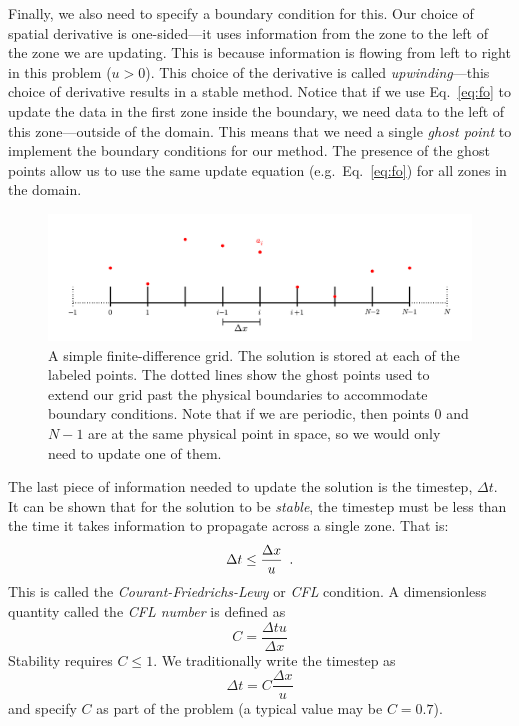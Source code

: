 Finally, we also need to specify a boundary condition for this.  Our
choice of spatial derivative is one-sided---it uses information from
the zone to the left of the zone we are updating.  This is because
information is flowing from left to right in this problem ($u > 0$).
This choice of the derivative is called {\em upwinding}---this choice
of derivative results in a stable method.
Notice that if we use Eq.~\ref{eq:fo} to update the data in the first
zone inside the boundary, we need data to the left of this
zone---outside of the domain.  This means that we need a single
{\em ghost point} to implement the boundary conditions for our method.  The
presence of the ghost points allow us to use the same update equation
(e.g.\ Eq.~\ref{eq:fo}) for all zones in the domain.


\begin{figure}[t]
\centering
\includegraphics[width=\linewidth]{fd_ghost}
\caption[A simple finite-difference grid]{\label{fig:fdgrid} A simple
  finite-difference grid.  The solution is stored at each of the
  labeled points.  The dotted lines show the ghost points used to
  extend our grid past the physical boundaries to accommodate boundary
  conditions.  Note that if we are periodic, then points $0$ and $N-1$
  are at the same physical point in space, so we would only need to
  update one of them.}
\end{figure}

The last piece of information needed to update the solution is the
timestep, $\Delta t$.  It can be shown that for the solution to be
{\em stable}, the timestep must be less than the time it takes information
to propagate across a single zone.  That is:
\begin{equation}
\Delta t \le \frac{\Delta x}{u} \enskip .
\end{equation}
This is called the {\em Courant-Friedrichs-Lewy} or {\em CFL}
condition.  A dimensionless quantity called the {\em CFL number} is 
defined as 
\begin{equation}
C = \frac{\Delta t u }{\Delta x} 
\end{equation}
Stability requires $C \le 1$.
%
We traditionally write the timestep as
\begin{equation}
\label{eq:timestep}
\Delta t = C \frac{\Delta x}{u}
\end{equation}
and specify $C$ as part of the problem (a typical value may be $C = 0.7$).

